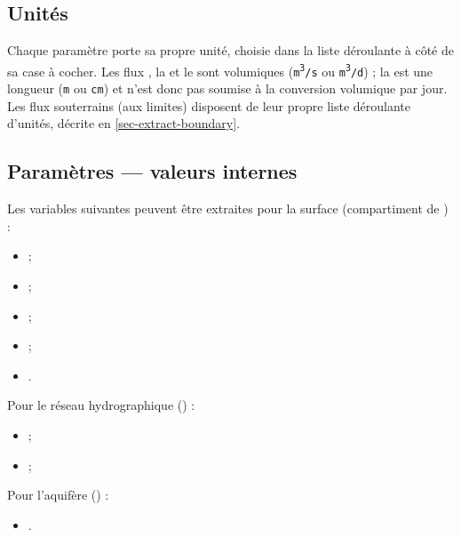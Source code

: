 \subsection{Unités}
\label{sec-extract-units}
Chaque paramètre porte sa propre unité, choisie dans la liste déroulante à côté de sa case à cocher. Les flux , la   et le   sont volumiques (\texttt{m\textsuperscript{3}/s} ou \texttt{m\textsuperscript{3}/d}) ; la   est une longueur (\texttt{m} ou \texttt{cm}) et n'est donc pas soumise à la conversion volumique par jour. Les flux souterrains (aux limites)  disposent de leur propre liste déroulante d'unités, décrite en \cref{sec-extract-boundary}.

\subsection{Paramètres --- valeurs internes}
\label{sec-extract-internal}
Les variables suivantes peuvent être extraites pour la surface (compartiment  de \cawaqs) :
\begin{itemize}
    \item {} ;
    \item {} ;
    \item {} ;
    \item {} ;
    \item {}.
\end{itemize}
Pour le réseau hydrographique () :
\begin{itemize}
    \item {} ;
    \item {} ;
\end{itemize}
Pour l'aquifère () :
\begin{itemize}
    \item {}.
\end{itemize}

